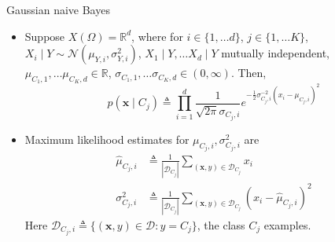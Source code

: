 \documentclass{beamer}
\numberwithin{equation}{section}
\begin{document}
\begin{frame}{Gaussian naive Bayes}
    \begin{itemize}
        \item
        Suppose $ X(\Omega) = \mathbb{R}^d $, where for
        $ i \in \{1, \ldots d\} $, $ j \in \{1, \ldots K\} $,
        $ X_i \mid Y \sim \mathcal{N}(\mu_{Y, i}, \sigma_{Y, i}^2) $,
        $ X_1 \mid Y, \ldots X_d \mid Y $ mutually independent,
        $ \mu_{C_1, 1}, \ldots \mu_{C_K, d} \in \mathbb{R} $,
        $ \sigma_{C_1, 1}, \ldots \sigma_{C_K, d} \in (0, \infty) $. Then,
        \begin{equation} \label{normal_nb_like}
            p(\mathbf{x} \mid C_j) \triangleq
            \prod_{i = 1}^d\frac{1}{\sqrt{2\pi}\sigma_{C_j, i}}e^{
                -\frac{1}{2}\sigma_{C_j, i}^{-2}(x_i - \mu_{C_j, i})^2
            }
        \end{equation}

        \item
        Maximum likelihood estimates for $ \mu_{C_j, i}, \sigma_{C_j, i}^2 $
        are
        \begin{equation}
            \begin{split}
            \hat{\mu}_{C_j, i} & \triangleq \frac{1}{|\mathcal{D}_{C_j}|}
                \sum_{(\mathbf{x}, y) \in \mathcal{D}_{C_j}}x_i \\
            \sigma_{C_j, i}^2 & \triangleq \frac{1}{|\mathcal{D}_{C_j}|}
                \sum_{(\mathbf{x}, y) \in \mathcal{D}_{C_j}}
                (x_i - \hat{\mu}_{C_j, i})^2
            \end{split}
        \end{equation}
        Here $ \mathcal{D}_{C_j, i} \triangleq \{(\mathbf{x}, y) \in
        \mathcal{D} : y = C_j\} $, the class $ C_j $ examples.
    \end{itemize}
\end{frame}
\end{document}
